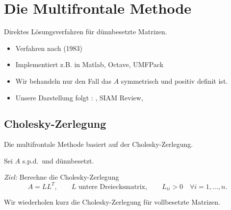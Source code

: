\section{Die Multifrontale Methode}

Direktes Lösungsverfahren für dünnbesetzte Matrizen.

\begin{itemize}
 \item Verfahren nach \citet{duff_reid:1983} (1983)
 \item Implementiert z.B. in Matlab, Octave, UMFPack
 \item Wir behandeln nur den Fall das $A$ symmetrisch und positiv definit ist.
 \item Unsere Darstellung folgt \citeauthor{liu:1992}: ,
       SIAM Review, \citeyear{liu:1992}~\cite{liu:1992}
\end{itemize}

\subsection{Cholesky-Zerlegung}

Die multifrontale Methode basiert auf der Cholesky-Zerlegung.

\medskip

Sei $A$ s.p.d.\ und dünnbesetzt.

\medskip

\emph{Ziel:} Berechne die Cholesky-Zerlegung
\begin{equation*}
 A = LL^T,
 \qquad
 \text{$L$ untere Dreiecksmatrix},
 \qquad
 L_{ii} > 0 \quad \forall i = 1,\dots,n.
\end{equation*}


Wir wiederholen kurz die Cholesky-Zerlegung für vollbesetzte Matrizen.

\medskip

